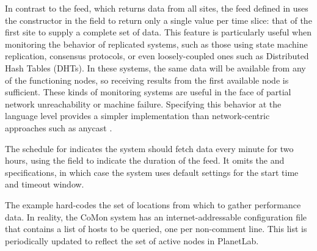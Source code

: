 In contrast to the  feed, which returns data from
all sites, the  feed defined in 
uses the  constructor in the  field to 
return only a single value per time slice: that of the first site to
supply a complete set of data.
%
%
This feature is particularly useful when monitoring the
behavior of replicated systems, such as those using
state machine replication, consensus protocols, or even
loosely-coupled ones such as Distributed Hash Tables (DHTs).
In these systems, the same data will be available from any
of the functioning nodes, so receiving results from the first
available node is sufficient. These kinds of monitoring systems
are useful in the face of partial network unreachability or
machine failure. Specifying this behavior at the language level
provides a simpler implementation than network-centric approaches such
as anycast \cite{anycast}. 

The schedule for  indicates the system should fetch data
every minute for two hours, using the  field to indicate
the duration of the feed.  It omits the  and
 specifications, in which case the system uses default
settings for the start time and timeout window.  



The  example hard-codes the set of locations from
which to gather performance data.  In reality, the CoMon system has an
internet-addressable configuration file that contains a list of hosts
to be queried, one per non-comment line. This list is periodically
updated to reflect the set of active nodes in PlanetLab. 



